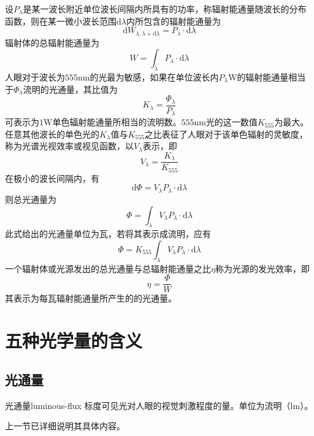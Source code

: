 \documentclass[cn,10pt,chinesefont=founder,math=mtpro2,cite=super,toc=onecol,twoside,openany]{elegantbook}
\begin{document}
设$P_\lambda$是某一波长附近单位波长间隔内所具有的功率，称辐射能通量随波长的分布函数，则在某一微小波长范围$\mathrm{d}\lambda$内所包含的辐射能通量为
\begin{equation}
\mathrm{d}W_{\lambda,\lambda+\mathrm{d}\lambda}=P_{\lambda}\cdot\mathrm{d}\lambda
\end{equation}
辐射体的总辐射能通量为
\begin{equation}
W=\int_{\lambda} P_{\lambda}\cdot\mathrm{d}\lambda
\end{equation}
人眼对于波长为$555\mathrm{nm}$的光最为敏感，如果在单位波长内$P_{\lambda}\mathrm{W}$的辐射能通量相当于$\varPhi_{\lambda}$流明的光通量，其比值为
\begin{equation}
K_{\lambda}=\frac{\varPhi_{\lambda}}{P_{\lambda}}
\end{equation}
可表示为$1\mathrm{W}$单色辐射能通量所相当的流明数。$555\mathrm{nm}$光的这一数值$K_{555}$为最大。任意其他波长的单色光的$K_{\lambda}$值与$K_{555}$之比表征了人眼对于该单色辐射的灵敏度，称为光谱光视效率或视见函数，以$V_{\lambda}$表示，即
\begin{equation}
V_{\lambda}=\frac{K_{\lambda}}{K_{555}}
\end{equation}
在极小的波长间隔内，有
\begin{equation}
\mathrm{d}\varPhi=V_{\lambda}P_{\lambda}\cdot\mathrm{d}\lambda
\end{equation}
则总光通量为
\begin{equation}
\varPhi=\int_{\lambda}V_{\lambda}P_{\lambda}\cdot\mathrm{d}\lambda
\end{equation}
此式给出的光通量单位为瓦，若将其表示成流明，应有
\begin{equation}
\varPhi=K_{555}\int_{\lambda}V_{\lambda}P_{\lambda}\cdot\mathrm{d}\lambda
\end{equation}
一个辐射体或光源发出的总光通量与总辐射能通量之比$\eta$称为光源的发光效率，即
\begin{equation}
\eta=\frac{\varPhi}{W}
\end{equation}
其表示为每瓦辐射能通量所产生的的光通量。

\section{五种光学量的含义}

\subsection{光通量}
\begin{definition}{光通量}{luminous-flux}
标度可见光对人眼的视觉刺激程度的量。单位为流明（$\mathrm{lm}$）。
\end{definition}
上一节已详细说明其具体内容。
\end{document}
